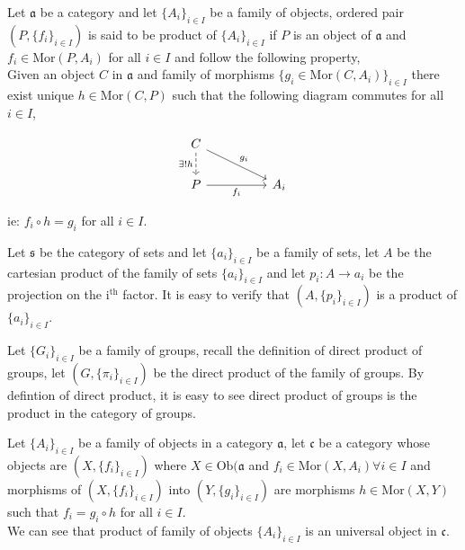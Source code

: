 \documentclass[11pt,a4paper]{colorart}
\def\mab{\mathfrak}
\def\oo{\circ}
\def\ra{\rightarrow}
\begin{document}
\begin{definition}
	Let $\mab{a}$ be a category and let $\{A_i\}_{i \in I}$ be a family of objects, ordered pair $(P,\{f_i\}_{i \in I})$ is said to be product of $\{A_i\}_{i \in I}$ if $P$ is an object of $\mab{a}$ and $f_i \in \text{Mor}(P,A_i)$ for all $i\in I$ and follow the following property,\\

	Given an object $C$ in $\mab{a}$ and family of morphisms $\{ g_i \in \text{Mor}(C,A_i) \}_{i\in I}$ there exist unique $h \in \text{Mor}(C,P)$ such that the following diagram commutes for all $i \in I$,

\[\begin{tikzcd}
	C \\
	P && {A_i}
	\arrow["{{\exists ! h}}"', dashed, from=1-1, to=2-1]
	\arrow["{{g_i}}", from=1-1, to=2-3]
	\arrow["{{f_i}}"', from=2-1, to=2-3]
\end{tikzcd}\]

ie: $f_i \oo h = g_i$ for all $i \in I$.

\end{definition}

\begin{example}
	Let $\mab{s}$ be the category of sets and let $\{a_i\}_{i \in I}$ be a family of sets, let $A$ be the cartesian product of the family of sets  $\{a_i\}_{i \in I}$ and let  $p_i : A \ra a_i$ be the projection on the i$^\text{th}$ factor. It is easy to verify that $(A, \{p_i\}_{i \in I})$ is a product of $\{a_i\}_{i \in I}$.
\end{example}

\begin{example}
	Let $\{G_i\}_{i \in I}$ be a family of groups, recall the definition of direct product of groups, let $(G, \{\pi_i\}_{i \in I})$ be the direct product of the family of groups. By defintion of direct product, it is easy to see direct product of groups is the product in the category of groups.
\end{example}

\begin{example}
	Let $\{A_i\}_{i \in I}$ be a family of objects in a category $\mab{a}$, let $\mab{c}$ be a category whose objects are $(X, \{f_i\}_{i \in I})$ where $X \in \text{Ob}(\mab{a}$ and $f_i \in \text{Mor}(X,A_i) \forall i \in I$ and morphisms of $(X, \{f_i\}_{i \in I})$ into $(Y, \{g_i\}_{i \in I})$ are morphisms $h \in \text{Mor}(X,Y)$ such that $f_i = g_i \oo h$ for all $i \in I$. \\

	We can see that product of family of objects $\{A_i\}_{i \in I}$ is an universal object in $\mab{c}$.
\end{example}
\end{document}
